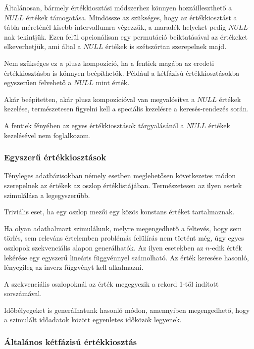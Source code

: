 \documentclass[
    parspace, %
    noindent, %
]{elteiktdk}[2023/04/10]
\begin{document}
Általánosan, bármely értékkiosztási módszerhez könnyen hozzáilleszthető a $NULL$ értékek támogatása.
Mindössze az szükséges, hogy az értékkiosztást a tábla méreténél kisebb intervallumra végezzük,
a maradék helyeket pedig $NULL$-nak tekintjük.
Ezen felül opcionálisan egy permutáció beiktatásával az értékeket elkeverhetjük,
ami által a $NULL$ értékek is szétszórtan szerepelnek majd.

Nem szükséges ez a plusz kompozíció,
ha a fentiek magába az eredeti értékkiosztásba is könnyen beépíthetők.
Például a kétfázisú értékkiosztásokba egyszerűen felvehető a $NULL$ mint érték.

Akár beépítetten, akár plusz kompozícióval van megvalósítva a $NULL$ értékek kezelése,
természetesen figyelni kell a speciális kezelésre a keresés-rendezés során.

A fentiek fényében az egyes értékkiosztások tárgyalásánál a $NULL$ értékek kezelésével nem foglalkozom.

\subsubsection{Egyszerű értékkiosztások}

Tényleges adatbázisokban némely esetben meglehetősen következetes módon
szerepelnek az értékek az oszlop értéklistájában.
Természetesen az ilyen esetek szimulálása a legegyszerűbb.

Triviális eset, ha egy oszlop mezői egy közös konstans értéket tartalmaznak.

Ha olyan adathalmazt szimulálunk, melyre megengedhető a feltevés,
hogy sem törlés, sem releváns értelemben problémás felülírás nem történt még,
úgy egyes oszlopok szekvenciális alapon generálhatók.
Az ilyen esetekben az $n$-edik érték lekérése
egy egyszerű lineáris függvénnyel számolható.
Az érték keresése hasonló, lényegileg az inverz függvényt kell alkalmazni.

A szekvenciális oszlopoknál az érték megegyezik a rekord 1-től indított sorszámával.

Időbélyegeket is generálhatunk hasonló módon,
amennyiben megengedhető, hogy a szimulált időadatok között egyenletes időközök legyenek.

\subsubsection{Általános kétfázisú értékkiosztás}

\end{document}
